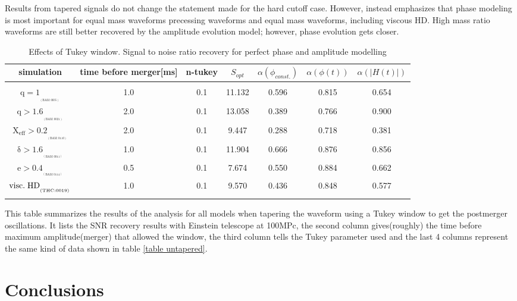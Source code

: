 Results from tapered signals do not change the statement made for the hard cutoff case. However, instead emphasizes that phase modeling is most important for equal mass waveforms precessing waveforms and equal mass waveforms, including viscous HD. High mass ratio waveforms are still better recovered by the amplitude evolution model; however, phase evolution gets closer.


\begin{table}[!htbp]
\begin{center}

\begin{tabular}{ccccccc}
simulation&time before merger[ms]&n-tukey&$S_{opt}$&$\alpha(\phi_{const.})$&$\alpha(\phi(t))$&$\alpha(|H(t)|)$\\ 
\hline\\ 
$\mathrm{{q=1}_{_{_{(BAM:0035)}}}}$&1.0&0.1&11.132&0.596&0.815&0.654\\  
$\mathrm{{q>1.6}_{_{_{(BAM:0021)}}}}$&2.0&0.1&13.058&0.389&0.766&0.900\\  
$\mathrm{{X_{eff}>0.2}_{_{_{(BAM:0110)}}}}$&2.0&0.1&9.447&0.288&0.718&0.381\\  
$\mathrm{{\delta>1.6}_{_{_{(BAM:0011)}}}}$&1.0&0.1&11.904&0.666&0.876&0.856\\  
$\mathrm{{e>0.4}_{_{_{(BAM:0114)}}}}$&0.5&0.1&7.674&0.550&0.884&0.662\\  
$\mathrm{{visc.\hspace{1mm} HD}_{_{_{(THC:0019)}}}}$&1.0&0.1&9.570&0.436&0.848&0.577\\  
\hline\\ 
\end{tabular}

\end{center}
\caption{Effects of Tukey window. Signal to noise ratio recovery for perfect phase and amplitude modelling}
This table summarizes the results of the analysis for all models when tapering the waveform using a Tukey window to get the postmerger oscillations. It lists the  SNR  recovery results with Einstein telescope at 100MPc, the second column gives(roughly) the time before maximum amplitude(merger) that allowed the window,  the third column tells the Tukey parameter used and the last 4 columns represent the same kind of data shown in table \ref{table untapered}.
\end{table}
\FloatBarrier

\newpage
{}

\chapter*{Conclusions}

